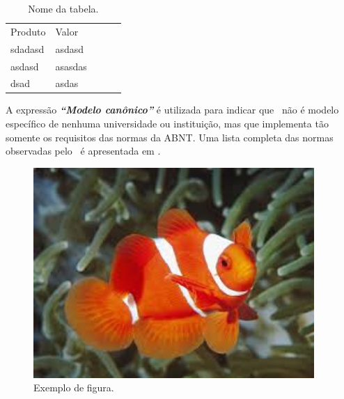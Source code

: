 \documentclass[
	12pt,				%
    oneside,			%
	a4paper,			%
	english,			%
	french,				%
	spanish,			%
	brazil,				%
	]{abntex2}
\begin{document}
\begin{table}[hbt] %
\begin{center}
\caption{Nome da tabela.} %
\begin{tabular}{|l|l|lll}
\cline{1-2}
Produto & Valor   &  &  &  \\ \cline{1-2}\cline{1-2}
sdadasd & asdasd  &  &  &  \\ \cline{1-2}
asdasd  & asasdas &  &  &  \\ \cline{1-2}
dsad    & asdas   &  &  &  \\ \cline{1-2}
\end{tabular}
\end{center}
\end{table}

A expressão \textit{\textbf{``Modelo canônico''}} é utilizada para indicar que \abnTeX\ não é
modelo específico de nenhuma universidade ou instituição, mas que implementa tão
somente os requisitos das normas da ABNT. Uma lista completa das normas
observadas pelo \abnTeX\ é apresentada em . %

\begin{figure} [hbt] 
\label{figura1} 
\caption{Exemplo de figura.}
\includegraphics[width=0.95\textwidth]{nemo.jpeg} %
\end{figure}
\end{document}
